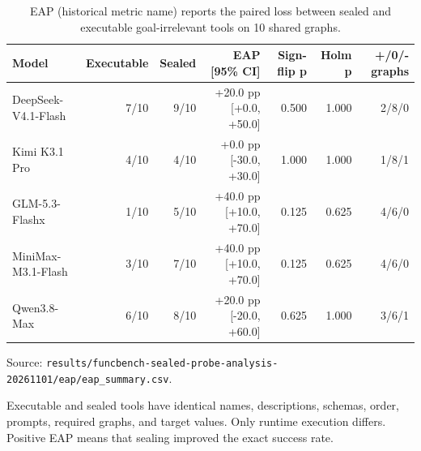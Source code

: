 \begin{table}[htbp]
\centering
\caption{EAP (historical metric name) reports the paired loss between sealed and executable goal-irrelevant tools on 10 shared graphs.}
\label{tab:eap}
\footnotesize
\setlength{\tabcolsep}{3pt}
\renewcommand{\arraystretch}{1.08}
\begin{tabularx}{\textwidth}{>{\raggedright\arraybackslash}Xrrrrrr}
\toprule
Model & Executable & Sealed & EAP [95\% CI] & Sign-flip p & Holm p & +/0/- graphs \\
\midrule
DeepSeek-V4.1-Flash & 7/10 & 9/10 & +20.0 pp [+0.0, +50.0] & 0.500 & 1.000 & 2/8/0 \\
Kimi K3.1 Pro & 4/10 & 4/10 & +0.0 pp [-30.0, +30.0] & 1.000 & 1.000 & 1/8/1 \\
GLM-5.3-Flashx & 1/10 & 5/10 & +40.0 pp [+10.0, +70.0] & 0.125 & 0.625 & 4/6/0 \\
MiniMax-M3.1-Flash & 3/10 & 7/10 & +40.0 pp [+10.0, +70.0] & 0.125 & 0.625 & 4/6/0 \\
Qwen3.8-Max & 6/10 & 8/10 & +20.0 pp [-20.0, +60.0] & 0.625 & 1.000 & 3/6/1 \\
\bottomrule
\end{tabularx}
\par\parbox{\linewidth}{\raggedright\footnotesize Source: \texttt{results/\allowbreak{}funcbench-sealed-probe-analysis-20261101/\allowbreak{}eap/\allowbreak{}eap\_summary.csv}.}
\par\parbox{\linewidth}{\raggedright\footnotesize Executable and sealed tools have identical names, descriptions, schemas, order, prompts, required graphs, and target values. Only runtime execution differs. Positive EAP means that sealing improved the exact success rate.}
\end{table}

